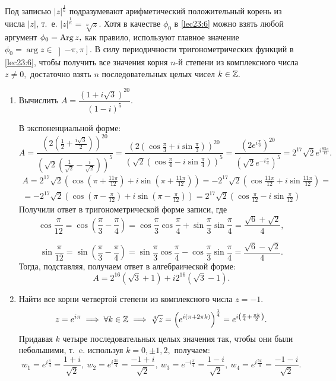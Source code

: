 \documentclass[../../main.tex]{subfiles}
\begin{document}
	Под записью $|z|^{\frac{1}{n}}$ подразумевают арифметический положительный
	корень из числа $|z|$, т.~е. $|z|^{\frac{1}{n}} = \sqrt[n]{z}.$ Хотя в
	качестве ${\phi}_0$ в \eqref{lec23:6} можно взять любой аргумент 
	${\phi}_0 = \operatorname{Arg} z,$ как правило, используют главное значение 
	${\phi}_0 = \arg z \in \left]-\pi, \pi\right].$ В силу периодичности тригонометрических
	функций в \eqref{lec23:6}, чтобы получить все значения корня $n$-й степени
	из комплексного числа $z\neq 0,$ достаточно взять $n$ последовательных целых
	чисел $k\in\mathbb{Z}.$
	
			\begin{examples}
		\;
		\begin{enumerate}
			\item Вычислить $A=\dfrac{(1+i\sqrt{3})^{20}}{(1-i)^5}.$
			
			В экспоненциальной форме:
			\[A = \frac{\left(2\left(\frac{1}{2}+\frac{i\sqrt{3}}{2}\right)
				\right)^{20}}{\left(\sqrt{2}\left(\frac{1}{\sqrt{2}}-\frac{i}
				{\sqrt{2}}\right)\right)^5} = \frac{\left(2\left(\cos \frac{\pi}
				{3}+i\sin \frac{\pi}{3}\right)\right)^{20}}{\left(\sqrt{2}\left(
				\cos \frac{\pi}{4}-i\sin \frac{\pi}{4}\right)\right)^5} =
			 \frac{\left(2e^{i\frac{\pi}{3}}\right)^{20}}{\left(\sqrt{2}
				e^{-i\frac{\pi}{4}}\right)^{5}} = 2^{17}\sqrt{2}e^
			{i\frac{95\pi}{12}}.\]
			\begin{multline*}A = 2^{17}\sqrt{2}\left(\cos \left(\pi+\frac{11\pi}
			{12}\right)+i\sin \left(\pi+\frac{11\pi}{12}\right)\right)= -2^{17}
			\sqrt{2}\left(\cos \frac{11\pi}{12}+i\sin \frac{11\pi}{12}\right)
			 = \\=-2^{17}\sqrt{2}\left(\cos \left(\pi-\frac{\pi}{12}\right)+
			 i\sin \left(\pi-\frac{\pi}{12}\right)\right)=2^{17}\sqrt{2}\left(
			 \cos \frac{\pi}{12}-i\sin \frac{\pi}{12}\right)\end{multline*}
			  Получили ответ в тригонометрической форме записи, где
			\[\cos \frac{\pi}{12} = \cos \left(\frac{\pi}{3} - 
			\frac{\pi}{4}\right) = \cos \frac{\pi}{3} \cos \frac{\pi}{4}
			+ \sin \frac{\pi}{3} \sin\frac{\pi}{4} =\frac{\sqrt{6}+\sqrt{2}}{4}
			,\]
			 
			 \[ \sin \frac{\pi}{12} = \sin \left(\frac{\pi}{3} - 
			 \frac{\pi}{4}\right) = \sin \frac{\pi}{3} \cos \frac{\pi}{4}
			 - \cos \frac{\pi}{3} \sin\frac{\pi}{4} =\frac{\sqrt{6}-
			 \sqrt{2}}{4}.\] Тогда,
			  подставляя, получаем ответ в алгебраической форме:
			 \[A =  2^{16}(\sqrt{3}+1) + i 2^{16}(\sqrt{3}-1).\]
		\item Найти все корни четвертой степени из комплексного числа $z = -1.$
		\[z = e^{i\pi} \implies \forall k\in\mathbb{Z} \implies \sqrt[4]{z} =
		\left(e^{i(\pi+2\pi k)}\right)^{\frac{1}{4}} = e^{i\left(
			\frac{\pi}{4}+\frac{\pi k}{2}\right)}.  \]
		Придавая $k$ четыре последовательных целых значения так, чтобы они были 
		небольшими, т.~e. используя $k = 0, \pm 1, 2,$ получаем:
		\[w_1 = e^{i\frac{\pi}{4}} = \frac{1+i}{\sqrt{2}},\ w_2 = 
		e^{i\frac{3\pi}{4}} = \frac{-1+i}{\sqrt{2}},\
		w_3 = e^{-i\frac{\pi}{4}} = \frac{1-i}{\sqrt{2}},\ w_4 = 
		e^{i\frac{5\pi}{4}} = \frac{-1-i}{\sqrt{2}}.\]
		

\end{enumerate}
\end{examples}
\end{document}
